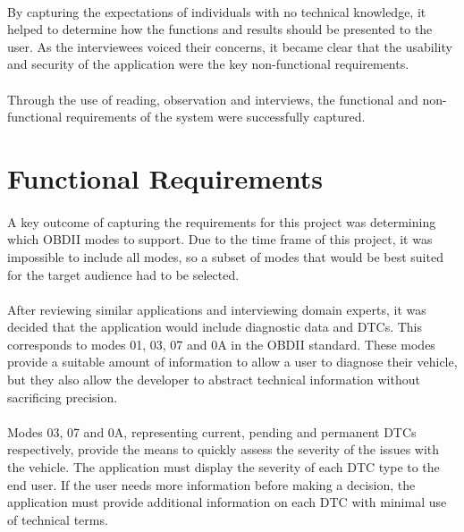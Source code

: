 	\paragraph{}{
	By capturing the expectations of individuals with no technical knowledge, it helped to determine how the functions and results should be presented to the user. As the interviewees voiced their concerns, it became clear that the usability and security of the application were the key non-functional requirements.
	}
	
	\paragraph{}{
	Through the use of reading, observation and interviews, the functional and non-functional requirements of the system were successfully captured.
	}
	
\section{Functional Requirements}	
	\paragraph{}{
	A key outcome of capturing the requirements for this project was determining which OBDII modes to support. Due to the time frame of this project, it was impossible to include all modes, so a subset of modes that would be best suited for the target audience had to be selected.
	}
	\paragraph{}{
	After reviewing similar applications and interviewing domain experts, it was decided that the application would include diagnostic data and DTCs. This corresponds to modes 01, 03, 07 and 0A in the OBDII standard. These modes provide a suitable amount of information to allow a user to diagnose their vehicle, but they also allow the developer to abstract technical information without sacrificing precision.
	}
	\paragraph{}{
	Modes 03, 07 and 0A, representing current, pending and permanent DTCs respectively, provide the means to quickly assess the severity of the issues with the vehicle. The application must display the severity of each DTC type to the end user. If the user needs more information before making a decision, the application must provide additional information on each DTC with minimal use of technical terms.
	}
